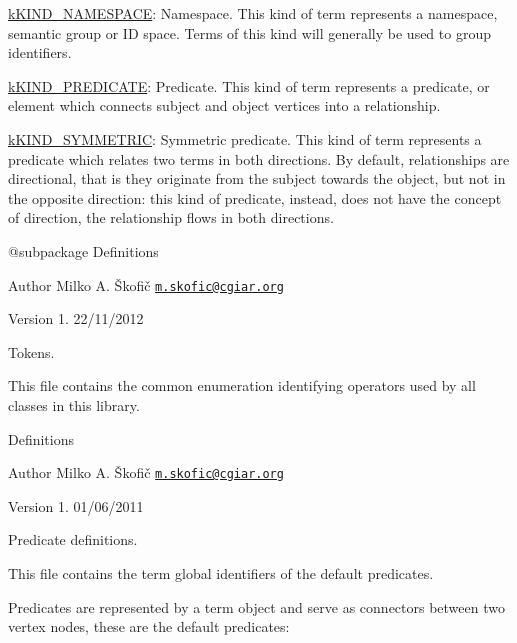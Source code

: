 \begin{DoxyItemize}
\item {\ttfamily \hyperlink{}{k\-K\-I\-N\-D\-\_\-\-N\-A\-M\-E\-S\-P\-A\-C\-E}}\-: Namespace. This kind of term represents a namespace, semantic group or I\-D space. Terms of this kind will generally be used to group identifiers. 
\item {\ttfamily \hyperlink{}{k\-K\-I\-N\-D\-\_\-\-P\-R\-E\-D\-I\-C\-A\-T\-E}}\-: Predicate. This kind of term represents a predicate, or element which connects subject and object vertices into a relationship. 
\item {\ttfamily \hyperlink{}{k\-K\-I\-N\-D\-\_\-\-S\-Y\-M\-M\-E\-T\-R\-I\-C}}\-: Symmetric predicate. This kind of term represents a predicate which relates two terms in both directions. By default, relationships are directional, that is they originate from the subject towards the object, but not in the opposite direction\-: this kind of predicate, instead, does not have the concept of direction, the relationship flows in both directions. 
\end{DoxyItemize}

\begin{DoxyVerb} @subpackage        Definitions
\end{DoxyVerb}


\begin{DoxyAuthor}{Author}
Milko A. Škofič \href{mailto:m.skofic@cgiar.org}{\tt m.\-skofic@cgiar.\-org} 
\end{DoxyAuthor}
\begin{DoxyVersion}{Version}
1. 22/11/2012
\end{DoxyVersion}
Tokens.

This file contains the common enumeration identifying operators used by all classes in this library.

Definitions

\begin{DoxyAuthor}{Author}
Milko A. Škofič \href{mailto:m.skofic@cgiar.org}{\tt m.\-skofic@cgiar.\-org} 
\end{DoxyAuthor}
\begin{DoxyVersion}{Version}
1. 01/06/2011
\end{DoxyVersion}
Predicate definitions.

This file contains the term global identifiers of the default predicates.

Predicates are represented by a term object and serve as connectors between two vertex nodes, these are the default predicates\-:


